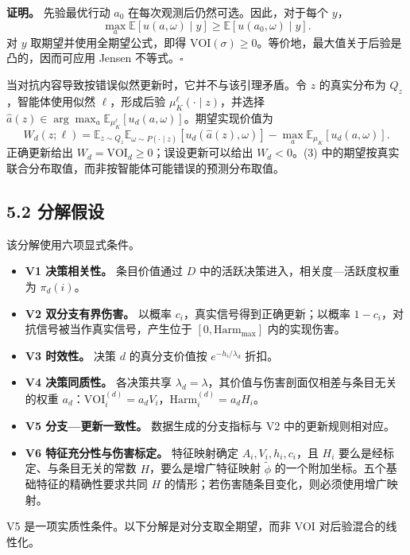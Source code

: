 \documentclass[
  chinese,
  11pt]{article}
\providecommand{\tightlist}{%
  \setlength{\itemsep}{0pt}\setlength{\parskip}{0pt}}
\begin{document}
\textbf{证明。} 先验最优行动 \(a_0\) 在每次观测后仍然可选。因此，对于每个 \(y\)， \[
\max_a\mathbb E[u(a,\omega)\mid y]\geq \mathbb E[u(a_0,\omega)\mid y].
\] 对 \(y\) 取期望并使用全期望公式，即得 \(\mathrm{VOI}(\sigma)\geq0\)。等价地，最大值关于后验是凸的，因而可应用 Jensen 不等式。\(\square\)

当对抗内容导致按错误似然更新时，它并不与该引理矛盾。令 \(z\) 的真实分布为 \(Q_z\)，智能体使用似然 \(\ell\)，形成后验 \(\mu_K^\ell(\cdot\mid z)\)，并选择 \(\hat a(z)\in\arg\max_a\mathbb E_{\mu_K^\ell}[u_d(a,\omega)]\)。期望实现价值为 \[
W_d(z;\ell)=\mathbb E_{z\sim Q_z}\mathbb E_{\omega\sim P(\cdot\mid z)}
[u_d(\hat a(z),\omega)]-\max_a\mathbb E_{\mu_K}[u_d(a,\omega)].
\tag{3}
\] 正确更新给出 \(W_d=\mathrm{VOI}_d\geq0\)；误设更新可以给出 \(W_d<0\)。(3) 中的期望按真实联合分布取值，而非按智能体可能错误的预测分布取值。

\subsection{5.2 分解假设}\label{ux5206ux89e3ux5047ux8bbe}

该分解使用六项显式条件。

\begin{itemize}
\tightlist
\item
  \textbf{V1 决策相关性。} 条目价值通过 \(D\) 中的活跃决策进入，相关度---活跃度权重为 \(\pi_d(i)\)。
\item
  \textbf{V2 双分支有界伤害。} 以概率 \(c_i\)，真实信号得到正确更新；以概率 \(1-c_i\)，对抗信号被当作真实信号，产生位于 \([0,\mathrm{Harm}_{\max}]\) 内的实现伤害。
\item
  \textbf{V3 时效性。} 决策 \(d\) 的真分支价值按 \(e^{-h_i/\lambda_d}\) 折扣。
\item
  \textbf{V4 决策同质性。} 各决策共享 \(\lambda_d=\lambda\)，其价值与伤害剖面仅相差与条目无关的权重 \(a_d\)：\(\mathrm{VOI}_i^{(d)}=a_dV_i\)，\(\mathrm{Harm}_i^{(d)}=a_dH_i\)。
\item
  \textbf{V5 分支---更新一致性。} 数据生成的分支指标与 V2 中的更新规则相对应。
\item
  \textbf{V6 特征充分性与伤害标定。} 特征映射确定 \(A_i,V_i,h_i,c_i\)，且 \(H_i\) 要么是经标定、与条目无关的常数 \(H\)，要么是增广特征映射 \(\tilde\phi\) 的一个附加坐标。五个基础特征的精确性要求共同 \(H\) 的情形；若伤害随条目变化，则必须使用增广映射。
\end{itemize}

V5 是一项实质性条件。以下分解是对分支取全期望，而非 VOI 对后验混合的线性化。
\end{document}

